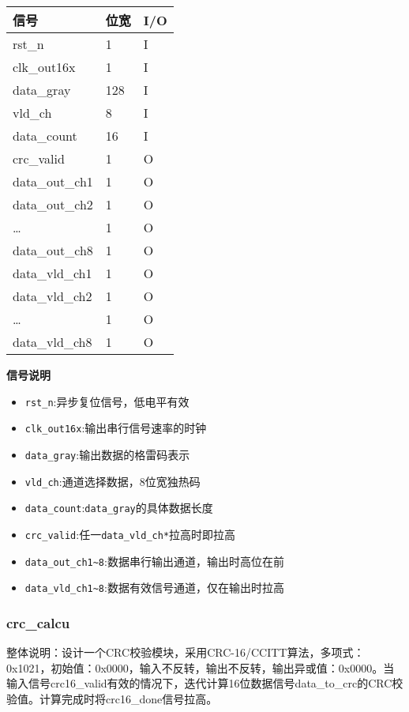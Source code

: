 \documentclass[12pt,]{article}
\providecommand{\tightlist}{%
  \setlength{\itemsep}{0pt}\setlength{\parskip}{0pt}}
\begin{document}
\begin{longtable}[]{@{}lll@{}}
\toprule\noalign{}
信号 & 位宽 & I/O \\
\midrule\noalign{}
\endhead
\bottomrule\noalign{}
\endlastfoot
rst\_n & 1 & I \\
clk\_out16x & 1 & I \\
data\_gray & 128 & I \\
vld\_ch & 8 & I \\
data\_count & 16 & I \\
crc\_valid & 1 & O \\
data\_out\_ch1 & 1 & O \\
data\_out\_ch2 & 1 & O \\
\ldots{} & 1 & O \\
data\_out\_ch8 & 1 & O \\
data\_vld\_ch1 & 1 & O \\
data\_vld\_ch2 & 1 & O \\
\ldots{} & 1 & O \\
data\_vld\_ch8 & 1 & O \\
\end{longtable}

\textbf{信号说明}

\begin{itemize}
\tightlist
\item
  \texttt{rst\_n}:异步复位信号，低电平有效
\item
  \texttt{clk\_out16x}:输出串行信号速率的时钟
\item
  \texttt{data\_gray}:输出数据的格雷码表示
\item
  \texttt{vld\_ch}:通道选择数据，8位宽独热码
\item
  \texttt{data\_count}:\texttt{data\_gray}的具体数据长度
\item
  \texttt{crc\_valid}:任一\texttt{data\_vld\_ch*}拉高时即拉高
\item
  \texttt{data\_out\_ch1\textasciitilde{}8}:数据串行输出通道，输出时高位在前
\item
  \texttt{data\_vld\_ch1\textasciitilde{}8}:数据有效信号通道，仅在输出时拉高
\end{itemize}

\hypertarget{crc_calcu}{%
\subsubsection{crc\_calcu}\label{crc_calcu}}

整体说明：设计一个CRC校验模块，采用CRC-16/CCITT算法，多项式：0x1021，初始值：0x0000，输入不反转，输出不反转，输出异或值：0x0000。当输入信号crc16\_valid有效的情况下，迭代计算16位数据信号data\_to\_crc的CRC校验值。计算完成时将crc16\_done信号拉高。
\end{document}
